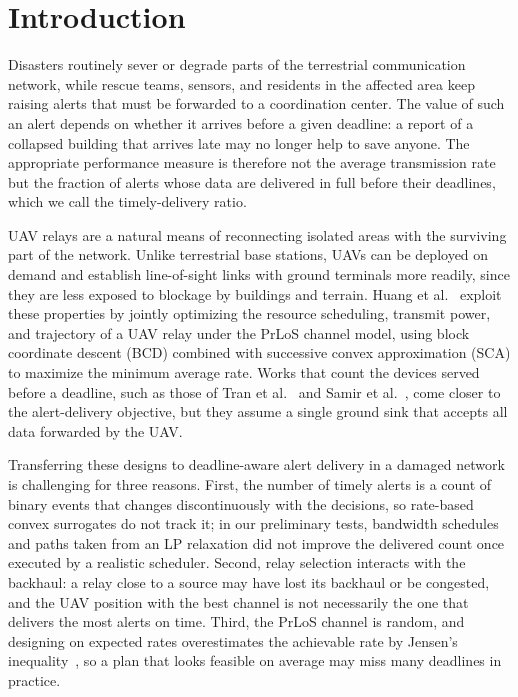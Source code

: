 \section{Introduction}
\label{sec:intro}

Disasters routinely sever or degrade parts of the terrestrial communication network, while rescue teams, sensors, and residents in the affected area keep raising alerts that must be forwarded to a coordination center. The value of such an alert depends on whether it arrives before a given deadline: a report of a collapsed building that arrives late may no longer help to save anyone. The appropriate performance measure is therefore not the average transmission rate but the fraction of alerts whose data are delivered in full before their deadlines, which we call the timely-delivery ratio.

UAV relays are a natural means of reconnecting isolated areas with the surviving part of the network. Unlike terrestrial base stations, UAVs can be deployed on demand and establish line-of-sight links with ground terminals more readily, since they are less exposed to blockage by buildings and terrain. Huang et al.~\cite{huang2025ddatsap} exploit these properties by jointly optimizing the resource scheduling, transmit power, and trajectory of a UAV relay under the PrLoS channel model, using block coordinate descent (BCD) combined with successive convex approximation (SCA) to maximize the minimum average rate. Works that count the devices served before a deadline, such as those of Tran et al.~\cite{tran2022relay} and Samir et al.~\cite{samir2020time}, come closer to the alert-delivery objective, but they assume a single ground sink that accepts all data forwarded by the UAV.

Transferring these designs to deadline-aware alert delivery in a damaged network is challenging for three reasons. First, the number of timely alerts is a count of binary events that changes discontinuously with the decisions, so rate-based convex surrogates do not track it; in our preliminary tests, bandwidth schedules and paths taken from an LP relaxation did not improve the delivered count once executed by a realistic scheduler. Second, relay selection interacts with the backhaul: a relay close to a source may have lost its backhaul or be congested, and the UAV position with the best channel is not necessarily the one that delivers the most alerts on time. Third, the PrLoS channel is random, and designing on expected rates overestimates the achievable rate by Jensen's inequality~\cite{park2026expected}, so a plan that looks feasible on average may miss many deadlines in practice.

